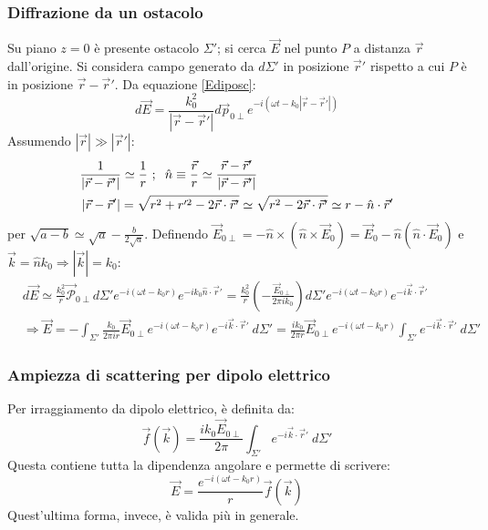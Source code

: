 \documentclass[10pt, a4paper]{scrartcl}
\numberwithin{equation}{subsection}
\theoremstyle{style1}
\begin{document}
\subsubsection{Diffrazione da un ostacolo}\label{diffost}
Su piano $z=0$ \`e presente ostacolo $\Sigma '$; si cerca $\vec{E}$ nel punto $P$ a distanza $\vec{r}$ dall'origine. Si considera campo generato da $d\Sigma'$ in posizione $\vec{r}'$ rispetto a cui $P$ \`e in posizione $\vec{r}- \vec{r}'$. Da equazione \ref{Ediposc}:
\[
d\vec{E} = \frac{k_0^2}{\left\lvert \vec{r}- \vec{r}' \right\rvert } d\vec{p}_{0\perp}  e^{-i(\omega t - k_0\left\lvert \vec{r}-\vec{r}' \right\rvert )} 
\] 
Assumendo $\left\lvert \vec{r} \right\rvert \gg \left\lvert \vec{r}' \right\rvert $:
\[
\begin{split}
	& \frac{1}{\left\lvert \vec{r}-\vec{r}' \right\rvert } \simeq \frac{1}{r}\ ; \hspace{0.2cm} \hat{n} \equiv \frac{\vec{r}}{r} \simeq \frac{\vec{r}-\vec{r}' }{\left\lvert \vec{r} - \vec{r}' \right\rvert }\\
	&\left\lvert \vec{r}- \vec{r}' \right\rvert = \sqrt{r^2 +r'^2 - 2\vec{r}\cdot \vec{r}'} \simeq \sqrt{r^2 - 2 \vec{r}\cdot \vec{r}'} \simeq r - \hat{n}\cdot \vec{r}'
\end{split}
\] 
per $\sqrt{a-b} \simeq \sqrt{a}  - \frac{b}{2\sqrt{a} }$. Definendo $\vec{E}_{0\perp}  = -\hat{n}\times (\hat{n}\times \vec{E}_0) = \vec{E}_0 - \hat{n}(\hat{n}\cdot \vec{E}_0)$ e $\vec{k}= \hat{n}k_0 \Rightarrow |\vec{k}| = k_0$:
\begin{equation}
	\begin{split}
		&d\vec{E} \simeq \frac{k_0^2}{r} \vec{\mathcal{P}}_{0\perp}  d\Sigma' e ^{-i (\omega t- k_0 r)}  e^{-ik_0\hat{n}\cdot \vec{r}'} = \frac{k_0^2}{r}\left(- \frac{\vec{E}_{0\perp} }{2\pi i k_0}\right) d\Sigma' e^{-i(\omega t - k_0 r)} e^{-i\vec{k}\cdot \vec{r}'}\\
		&\Rightarrow \vec{E}= - \int_{\Sigma '} \frac{k_0}{2\pi i r } \vec{E}_{0\perp} e^{-i(\omega t - k_0r ) }  e^{-i \vec{k}\cdot \vec{r}'} \ d\Sigma'=\frac{ik_0}{2\pi r} \vec{E}_{0\perp} e^{-i(\omega t - k_0r)} \int_{\Sigma'} e^{-i\vec{k}\cdot \vec{r}'} \ d \Sigma '
	\end{split}
\end{equation}
\subsubsection{Ampiezza di scattering per dipolo elettrico}
Per irraggiamento da dipolo elettrico, \`e definita da:
\begin{equation}
	\vec{f}(\vec{k}) = \frac{ik_0\vec{E}_{0\perp} }{2\pi} \int_{\Sigma ' } e ^{-i \vec{k}\cdot \vec{r}'}  \ d\Sigma '
\end{equation}
Questa contiene tutta la dipendenza angolare e permette di scrivere:
\begin{equation}
	\vec{E} = \frac{e^{-i(\omega t - k_0r)} }{r} \vec{f}(\vec{k})
\end{equation}
Quest'ultima forma, invece, \`e valida pi\`u in generale.
\end{document}
